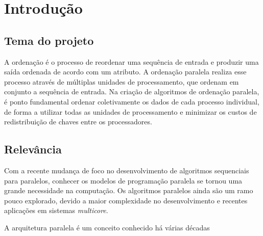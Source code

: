 \chapter{Introdução}

\section{Tema do projeto}


A ordenação é o processo de reordenar uma sequência de entrada e produzir uma saída ordenada de acordo com um atributo. A ordenação paralela realiza esse processo através de múltiplas unidades de processamento, que ordenam em conjunto a sequência de entrada. Na criação de algoritmos de ordenação paralela, é ponto fundamental ordenar coletivamente os dados de cada processo individual, de forma a utilizar todas as unidades de processamento e minimizar os custos de redistribuição de chaves entre os processadores. \cite{Kale:2010} 

\section{Relevância}


Com a recente mudança de foco no desenvolvimento de algoritmos sequenciais para paralelos, conhecer os modelos de programação paralela se tornou uma grande necessidade na computação. Os algoritmos paralelos ainda são um ramo pouco explorado, devido a  maior complexidade no desenvolvimento e recentes aplicações em sistemas \textit{multicore}.

%

A arquitetura paralela é um conceito conhecido há várias décadas 

%



